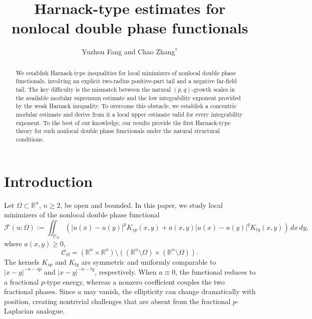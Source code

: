 \documentclass[reqno]{amsart}
\title[Harnack estimates for nonlocal double phase functionals]
{Harnack-type estimates for nonlocal double phase functionals}
\author[Y. Fang and C. Zhang \hfil \hfilneg]{Yuzhou Fang and Chao Zhang$^*$}
\newcommand{\R}{\mathbb R}
\newcommand{\dd}{\,d}
\newcommand{\calC}{\mathcal C}
\newcommand{\calF}{\mathcal F}
\theoremstyle{plain}
\theoremstyle{definition}
\theoremstyle{remark}
\numberwithin{equation}{section}
\begin{document}
\begin{abstract}
We establish Harnack-type inequalities for local minimizers of nonlocal double
phase functionals, involving an explicit two-radius positive-part tail and a
negative far-field tail. The key difficulty is the mismatch between the
natural \((p,q)\)-growth scales in the available modular supremum estimate and
the low integrability exponent provided by the weak Harnack inequality. To
overcome this obstacle, we establish a concentric modular estimate and derive
from it a local upper estimate valid for every integrability exponent. To the
best of our knowledge, our results provide the first Harnack-type theory for
such nonlocal double phase functionals under the natural structural
conditions.
\end{abstract}

\maketitle

\section{Introduction}

Let \(\Omega\subset\R^n\), \(n\ge2\), be open and bounded. In this paper, we
study local minimizers of the nonlocal double phase functional
\begin{equation}\label{main}
    \calF(u;\Omega)
    :=\iint_{\calC_\Omega}\left(|u(x)-u(y)|^p K_{sp}(x,y)+ a(x,y)|u(x)-u(y)|^q K_{tq}(x,y)
    \right)\dd x\!\dd y ,
\end{equation}
where $a(x,y)\ge0$,
\[
  \calC_\Omega=(\R^n\times\R^n)\setminus((\R^n\setminus\Omega)\times(\R^n\setminus\Omega)).
\]
The kernels \(K_{sp}\) and \(K_{tq}\) are symmetric and uniformly comparable
to \(|x-y|^{-n-sp}\) and \(|x-y|^{-n-tq}\), respectively. When \(a\equiv0\),
the functional reduces to a fractional \(p\)-type energy, whereas a nonzero
coefficient couples the two fractional phases. Since \(a\) may vanish, the
ellipticity can change dramatically with position, creating nontrivial challenges that
are absent from the fractional \(p\)-Laplacian analogue.
\end{document}
